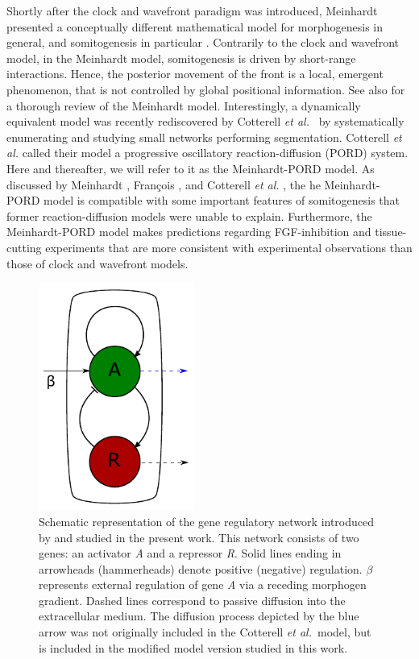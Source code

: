 \documentclass[%
 preprint,
 aip, 
 amsmath,amssymb,
]{revtex4-2}
\begin{document}
Shortly after the clock and wavefront paradigm was introduced, Meinhardt presented a conceptually different mathematical model for morphogenesis in general, and somitogenesis in particular \cite{Meinhardt1982}. Contrarily to the clock and wavefront model, in the Meinhardt model, somitogenesis is driven by short-range interactions. Hence, the posterior movement of the front is a local, emergent phenomenon, that is not controlled by global positional information. See also \cite{Francois2018} for a thorough review of the Meinhardt model. Interestingly, a dynamically equivalent model was recently rediscovered by Cotterell \emph{et al.}~\cite{Cotterell2015} by systematically enumerating and studying small networks performing segmentation. Cotterell \emph{et al.} called their model a progressive oscillatory reaction-diffusion (PORD) system. Here and thereafter, we will refer to it as the Meinhardt-PORD model. As discussed by Meinhardt \citep{Meinhardt1982}, Fran\c{c}ois \citep{Francois2018}, and Cotterell \emph{et al.} \cite{Cotterell2015}, the he Meinhardt-PORD model is compatible with some important features of somitogenesis that former reaction-diffusion models were unable to explain. Furthermore, the Meinhardt-PORD model makes predictions regarding FGF-inhibition and tissue-cutting experiments that are more consistent with experimental observations than those of clock and wavefront models.
	
	\begin{figure}[t!]
		\centering
		\includegraphics[width=2in]{Fig01.pdf}
		\caption{Schematic representation of the gene regulatory network introduced by
			\cite{Cotterell2015} and studied in the present work. This network consists of
			two genes: an activator \textit{A} and a repressor \textit{R}. Solid lines
			ending in arrowheads (hammerheads) denote positive (negative) regulation.
			$\beta$ represents external regulation of gene \textit{A} via a 
			receding morphogen gradient. Dashed lines correspond to passive diffusion into the extracellular
			medium. The diffusion process depicted by the blue arrow was not
			originally included in the Cotterell {\em et al.}~model, but is 
			included in the modified model version studied in this work.}
		\label{Fig01}
	\end{figure}
	
\end{document}
